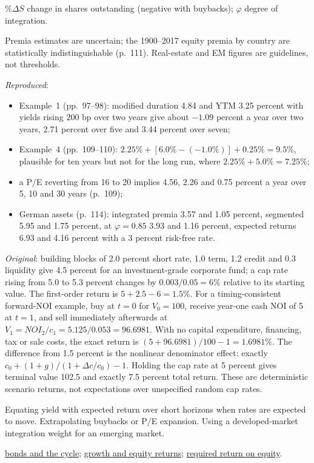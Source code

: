 \begin{qfmethod}
 $\%\Delta S$ change in shares outstanding (negative with buybacks); $\varphi$ degree of integration.

 Premia estimates are uncertain; the 1900--2017 equity premia by country are statistically indistinguishable (p.~111). Real-estate and EM figures are guidelines, not thresholds.

 \emph{Reproduced}:
\begin{itemize}
\item Example~1 (pp.~97--98): modified duration 4.84 and YTM 3.25 percent with yields rising 200 bp over two years give about $-1.09$ percent a year over two years, 2.71 percent over five and 3.44 percent over seven;
\item Example~4 (pp.~109--110): $2.25\%+[6.0\%-(-1.0\%)]+0.25\%=9.5\%$, plausible for ten years but not for the long run, where $2.25\%+5.0\%=7.25\%$;
\item a P/E reverting from 16 to 20 implies 4.56, 2.26 and 0.75 percent a year over 5, 10 and 30 years (p.~109);
\item German assets (p.~114): integrated premia 3.57 and 1.05 percent, segmented 5.95 and 1.75 percent, at $\varphi=0.85$ 3.93 and 1.16 percent, expected returns 6.93 and 4.16 percent with a 3 percent risk-free rate.
\end{itemize}
\emph{Original}: building blocks of 2.0 percent short rate, 1.0 term, 1.2 credit and 0.3 liquidity give 4.5 percent for an investment-grade corporate fund; a cap rate rising from 5.0 to 5.3 percent changes by $0.003/0.05=6\%$ relative to its starting value. The first-order return is $5+2.5-6=1.5\%$. For a timing-consistent forward-NOI example, buy at $t=0$ for $V_0=100$, receive year-one cash NOI of 5 at $t=1$, and sell immediately afterwards at $V_1=NOI_2/c_1=5.125/0.053=96.6981$. With no capital expenditure, financing, tax or sale costs, the exact return is $(5+96.6981)/100-1=1.6981\%$. The difference from 1.5 percent is the nonlinear denominator effect: exactly $c_0+(1+g)/(1+\Delta c/c_0)-1$. Holding the cap rate at 5 percent gives terminal value 102.5 and exactly 7.5 percent total return. These are deterministic scenario returns, not expectations over unspecified random cap rates.

 Equating yield with expected return over short horizons when rates are expected to move. Extrapolating buybacks or P/E expansion. Using a developed-market integration weight for an emerging market.

 \hyperref[meth:cycle-rates-breakevens-spreads]{bonds and the cycle}; \hyperref[meth:potential-gdp-growth-accounting]{growth and equity returns}; \hyperref[meth:required-return-on-equity]{required return on equity}.

\end{qfmethod}

